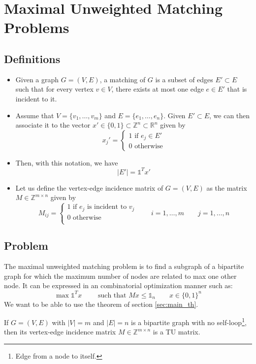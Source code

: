 \documentclass[12pt, openany]{report}
\begin{document}
\section{Maximal Unweighted Matching Problems}
\subsection{Definitions}
\begin{itemize}
    \item Given a graph \(G=(V,E)\), a matching of \(G\) is a subset of edges \(E'\subset E\) such that for every vertex \(v\in V\), there exists at most one edge \(e\in E'\) that is incident to it.
    \item Assume that \(V=\{v_1,\dots,v_m\}\) and \(E=\{e_1,\dots, e_n\}\). Given \(E'\subset E\), we can then associate it to the vector \(x'\in \{0,1\}\subset \mathbb{Z}^n\subset \mathbb{R}^n\) given by 
    \begin{equation}
        x_j' = \begin{cases}
            1 \text{ if } e_j \in E'\\
            0\text{ otherwise}
        \end{cases}
    \end{equation}
    \item Then, with this notation, we have 
    \begin{equation}
        |E'| = \mathbb{1}^Tx'
    \end{equation}
    \item Let us define the vertex-edge incidence matrix of \(G=(V,E)\) as the matrix \(M\in \mathbb{Z}^{m\times n}\) given by
    \begin{equation}
        M_{ij} = \begin{cases} 1 \text{ if }e_j\text{ is incident to }v_j\\ 0 \text{ otherwise}\\ \end{cases} \qquad i=1,\dots,m\qquad j=1,\dots,n
    \end{equation}
\end{itemize}
\subsection{Problem}
The maximal unweighted matching problem is to find a subgraph of a bipartite graph for which the maximum number of nodes are related to max one other node. It can be expressed in an combinatorial optimization manner such as:
\begin{equation}
    \max \mathbb{1}^Tx \qquad \text{ such that } Mx\le \mathbb{1}_n \qquad x\in \{0,1\}^n
\end{equation}
We want to be able to use the theorem of section \ref{sec:main_th}. 
\begin{tcolorbox}[breakable,
    colback=white,
    colframe=white!75!black,
    title={Theorem}]
If \(G=(V,E)\) with \(|V| = m\) and \(|E|=n\) is a bipartite graph with no self-loop\footnote{Edge from a node to itself.}, then its vertex-edge incidence matrix \(M\in \mathbb{Z}^{m\times n}\) is a TU matrix.
\end{tcolorbox}
\end{document}
